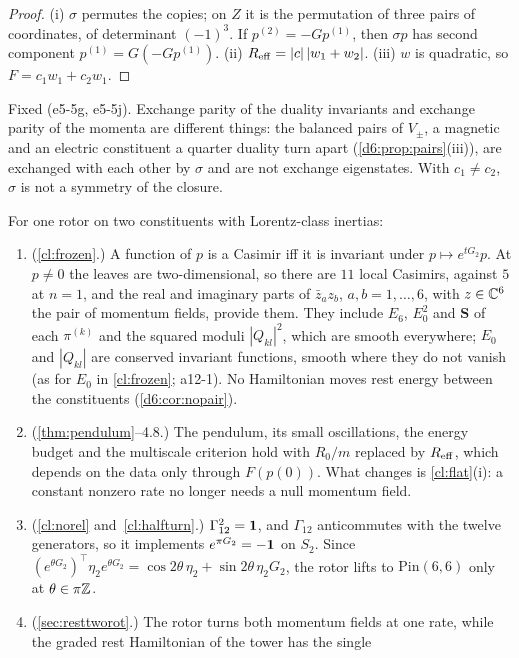 \begin{proof}
(i) $\sigma$ permutes the copies; on $Z$ it is the permutation of three pairs of coordinates, of determinant $(-1)^3$. If $p^{(2)}=-Gp^{(1)}$, then
$\sigma p$ has second component $p^{(1)}=G(-Gp^{(1)})$. (ii) $R_{\rm eff}=|c|\,|w_1+w_2|$. (iii) $w$ is quadratic, so $F=c_1w_1+c_2w_1$.
\end{proof}

Fixed (e5-5g, e5-5j). Exchange parity of the duality invariants and exchange parity of the momenta are different things: the balanced pairs of $V_\pm$, a
magnetic and an electric constituent a quarter duality turn apart (\cref{d6:prop:pairs}(iii)), are exchanged with each other by $\sigma$ and are
not exchange eigenstates. With $c_1\neq c_2$, $\sigma$ is not a symmetry of the closure.

\begin{proposition}
\label{e5:prop:carry}
For one rotor on two constituents with Lorentz-class inertias:
\begin{enumerate}[label=(\roman*),leftmargin=2.2em]
\item (\cref{cl:frozen}.) A function of $p$ is a Casimir iff it is invariant under $p\mapsto e^{tG_2}p$. At $p\neq0$ the leaves are
two-dimensional, so there are $11$ local Casimirs, against $5$ at $n=1$, and the real and imaginary parts of $\bar z_az_b$, $a,b=1,\dots,6$, with $z\in\mathbb{C}^6$ the pair of
momentum fields, provide them. They include $E_6$, $E_0^2$ and $\mathbf S$ of each $\pi^{(k)}$ and the squared moduli $|Q_{kl}|^2$, which are smooth
everywhere; $E_0$ and $|Q_{kl}|$ are conserved invariant functions, smooth where they do not vanish (as for $E_0$ in \cref{cl:frozen}; a12-1). No Hamiltonian moves rest energy
between the constituents (\cref{d6:cor:nopair}).
\item (\cref{thm:pendulum}--4.8.) The pendulum, its small oscillations, the energy budget and the multiscale criterion hold with $R_0/m$ replaced
by $R_{\rm eff}$, which depends on the data only through $F(p(0))$. What changes is \cref{cl:flat}(i): a constant nonzero rate no longer
needs a null momentum field.
\item (\cref{cl:norel} and~\cref{cl:halfturn}.) $\Gamma_{12}^2=\mathbf 1$, and $\Gamma_{12}$ anticommutes with the twelve generators, so it implements
$e^{\pi G_2}=-\mathbf 1$ on $S_2$. Since $(e^{\theta G_2})^{\!\top}\eta_2e^{\theta G_2}=\cos2\theta\,\eta_2+\sin2\theta\,\eta_2G_2$, the rotor lifts to
$\mathrm{Pin}(6,6)$ only at $\theta\in\pi\mathbb{Z}$.
\item (\cref{sec:resttworot}.) The rotor turns both momentum fields at one rate, while the graded rest Hamiltonian of the tower has the single

\end{enumerate}
\end{proposition}

